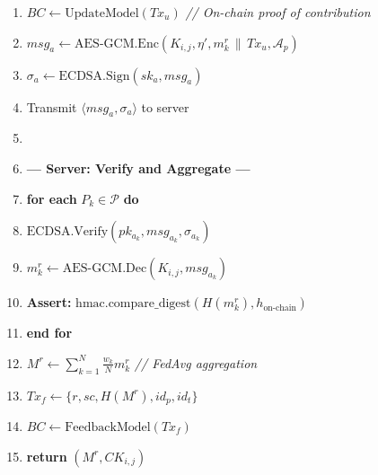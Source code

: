 \documentclass[journal, 10pt, twocolumn]{IEEEtran}
\begin{document}
\begin{figure}[!t]
\begin{enumerate}
    \item $BC \leftarrow \text{UpdateModel}(Tx_u)$ \quad \textit{// On-chain proof of contribution}
    \item $msg_a \leftarrow \text{AES-GCM.Enc}(K_{i,j}, \eta', m_k^r \,\|\, Tx_u, \mathcal{A}_p)$
    \item $\sigma_a \leftarrow \text{ECDSA.Sign}(sk_a, msg_a)$
    \item Transmit $\langle msg_a, \sigma_a \rangle$ to server
    \item[]
    \item[] \textbf{--- Server: Verify and Aggregate ---}
    \item \textbf{for each} $P_k \in \mathcal{P}$ \textbf{do}
    \item \quad $\text{ECDSA.Verify}(pk_{a_k}, msg_{a_k}, \sigma_{a_k})$
    \item \quad $m_k^r \leftarrow \text{AES-GCM.Dec}(K_{i,j}, msg_{a_k})$
    \item \quad \textbf{Assert:} $\text{hmac.compare\_digest}(H(m_k^r), h_{\text{on-chain}})$
    \item \textbf{end for}
    \item $M^r \leftarrow \sum_{k=1}^{N} \frac{w_k}{N} m_k^r$ \quad \textit{// FedAvg aggregation}
    \item $Tx_f \leftarrow \{r, sc, H(M^r), id_p, id_t\}$
    \item $BC \leftarrow \text{FeedbackModel}(Tx_f)$
    \item \textbf{return} $(M^r, CK_{i,j})$
\end{enumerate}
\hrulefill
\end{figure}
\end{document}
